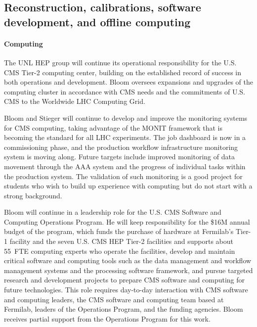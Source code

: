 \subsection{Reconstruction, calibrations, software development, and offline computing}

\paragraph{Computing} The UNL HEP group will continue its operational responsibility for the U.S. CMS Tier-2 computing center, building on the established record of success in both operations and development. Bloom oversees expansions and upgrades of the computing cluster in accordance with CMS needs and the commitments of U.S. CMS to the Worldwide LHC Computing Grid.

Bloom and Stieger will continue to develop and improve the monitoring systems for CMS computing, taking advantage of the MONIT framework that is becoming the standard for all LHC experiments.  The job dashboard is now in a commissioning phase, and the production workflow infrastructure monitoring system is moving along.  Future targets include improved monitoring of data movement through the AAA system and the progress of individual tasks within the production system.  The validation of such monitoring is a good project for students who wish to build up experience with computing but do not start with a strong background.

Bloom will continue in a leadership role for the U.S. CMS Software and Computing Operations Program.  He will keep responsibility for the \$16M annual budget of the program, which funds the purchase of hardware at Fermilab's Tier-1 facility and the seven U.S. CMS HEP Tier-2 facilities and supports about 55~FTE computing experts who operate the facilities, develop and maintain critical software and computing tools such as the data management and workflow management systems and the processing software framework, and pursue targeted research and development projects to prepare CMS software and computing for future technologies.  This role requires day-to-day interaction with CMS software and computing leaders, the CMS software and computing team based at Fermilab, leaders of the Operations Program, and the funding agencies.  Bloom receives partial support from the Operations Program for this work.

